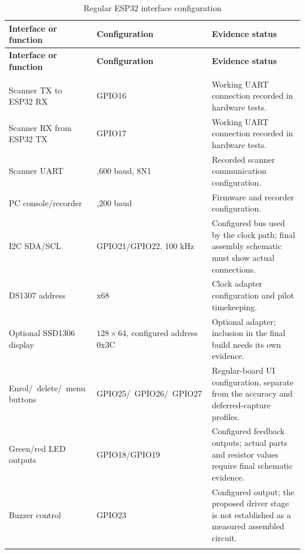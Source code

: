 \begingroup
\singlespacing%
\setlength{\tabcolsep}{4pt}
\begin{longtable}{@{}>{\RaggedRight\arraybackslash}p{}>{\RaggedRight\arraybackslash}p{}>{\RaggedRight\arraybackslash}p{}@{}}
\caption{Regular ESP32 interface configuration}\label{tab:3-6}\\
\toprule
\textbf{Interface or function} & \textbf{Configuration} & \textbf{Evidence status} \\
\midrule
\endfirsthead%
\toprule
\textbf{Interface or function} & \textbf{Configuration} & \textbf{Evidence status} \\
\midrule
\endhead%
\midrule
\multicolumn{3}{r}{Continued on next page}\\
\endfoot%
\bottomrule
\endlastfoot%
Scanner TX to ESP32 RX & GPIO16 & Working UART connection recorded in hardware tests. \\ \addlinespace
Scanner RX from ESP32 TX & GPIO17 & Working UART connection recorded in hardware tests. \\ \addlinespace
Scanner UART & 57,600 baud, 8N1 & Recorded scanner communication configuration. \\ \addlinespace
PC console/recorder & 115,200 baud & Firmware and recorder configuration. \\ \addlinespace
I2C SDA/SCL & GPIO21/GPIO22, 100 kHz & Configured bus used by the clock path; final assembly schematic must show actual connections. \\ \addlinespace
DS1307 address & 0\(\text{x}\)68 & Clock adapter configuration and pilot timekeeping. \\ \addlinespace
Optional SSD1306 display & \(128\times64\), configured address 0\(\text{x}\)3C & Optional adapter; inclusion in the final build needs its own evidence. \\ \addlinespace
Enrol/\allowbreak~delete/\allowbreak~menu buttons & GPIO25/\allowbreak~GPIO26/\allowbreak~GPIO27 & Regular-board UI configuration, separate from the accuracy and deferred-capture profiles. \\ \addlinespace
Green/red LED outputs & GPIO18/GPIO19 & Configured feedback outputs; actual parts and resistor values require final schematic evidence. \\ \addlinespace
Buzzer control & GPIO23 & Configured output; the proposed driver stage is not established as a measured assembled circuit. \\ \addlinespace
\end{longtable}
\endgroup
